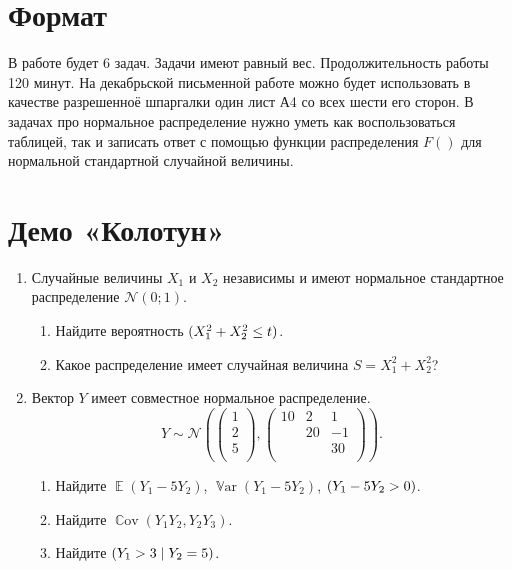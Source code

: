 \documentclass[12pt]{article}
\DeclareMathOperator{\Cov}{\mathbb{C}ov}
\DeclareMathOperator{\Var}{\mathbb{V}ar}
\let\P\relax
\DeclareMathOperator{\P}{\mathbb{P}}
\DeclareMathOperator{\E}{\mathbb{E}}
\newcommand \cN{\mathcal{N}}
\begin{document}
\section*{Формат}

В работе будет 6 задач. 
Задачи имеют равный вес. 
Продолжительность работы 120 минут. 
На декабрьской письменной работе можно будет использовать в качестве разрешенноё шпаргалки один лист А4 со всех шести его сторон.
В задачах про нормальное распределение нужно уметь как воспользоваться таблицей, так и записать ответ с помощью функции распределения $F()$ для нормальной стандартной случайной величины.

\section*{Демо «Колотун»}
\begin{enumerate}
    \item %
    Случайные величины $X_1$ и $X_2$ независимы и имеют нормальное стандартное распределение $\cN(0;1)$.
    \begin{enumerate}
        \item Найдите вероятность $\P(X_1^2 + X_2^2 \leq t)$.
        \item Какое распределение имеет случайная величина $S = X_1^2 + X_2^2$?
    \end{enumerate}
    
    \item Вектор $Y$ имеет совместное нормальное распределение. 
    \[
    Y \sim \cN\left( \begin{pmatrix}
        1 \\
        2 \\
        5 \\
    \end{pmatrix}, 
    \begin{pmatrix}
        10 & 2 & 1 \\
         & 20 & -1 \\
         & & 30 \\
    \end{pmatrix}
    \right).
    \]
\begin{enumerate}
    \item Найдите $\E(Y_1 - 5Y_2)$, $\Var(Y_1 - 5Y_2)$, $\P(Y_1 - 5Y_2 > 0)$.
    \item Найдите $\Cov(Y_1 Y_2, Y_2 Y_3)$.
    \item Найдите $\P(Y_1 > 3 \mid Y_2 = 5)$.
\end{enumerate}    



\end{enumerate}
\end{document}
